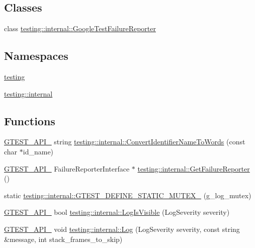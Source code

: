 \subsection*{Classes}
\begin{DoxyCompactItemize}
\item 
class \hyperlink{classtesting_1_1internal_1_1GoogleTestFailureReporter}{testing\+::internal\+::\+Google\+Test\+Failure\+Reporter}
\end{DoxyCompactItemize}
\subsection*{Namespaces}
\begin{DoxyCompactItemize}
\item 
 \hyperlink{namespacetesting}{testing}
\item 
 \hyperlink{namespacetesting_1_1internal}{testing\+::internal}
\end{DoxyCompactItemize}
\subsection*{Functions}
\begin{DoxyCompactItemize}
\item 
\hyperlink{gtest-port_8h_aa73be6f0ba4a7456180a94904ce17790}{G\+T\+E\+S\+T\+\_\+\+A\+P\+I\+\_\+} string \hyperlink{namespacetesting_1_1internal_a571db854f6de337007c53573c9cbf8a3}{testing\+::internal\+::\+Convert\+Identifier\+Name\+To\+Words} (const char $\ast$id\+\_\+name)
\item 
\hyperlink{gtest-port_8h_aa73be6f0ba4a7456180a94904ce17790}{G\+T\+E\+S\+T\+\_\+\+A\+P\+I\+\_\+} Failure\+Reporter\+Interface $\ast$ \hyperlink{namespacetesting_1_1internal_aa261c22df383e9007129c92e36e30e62}{testing\+::internal\+::\+Get\+Failure\+Reporter} ()
\item 
static \hyperlink{namespacetesting_1_1internal_a65647f11a4a74a4282c3cc6d422af0f1}{testing\+::internal\+::\+G\+T\+E\+S\+T\+\_\+\+D\+E\+F\+I\+N\+E\+\_\+\+S\+T\+A\+T\+I\+C\+\_\+\+M\+U\+T\+E\+X\+\_\+} (g\+\_\+log\+\_\+mutex)
\item 
\hyperlink{gtest-port_8h_aa73be6f0ba4a7456180a94904ce17790}{G\+T\+E\+S\+T\+\_\+\+A\+P\+I\+\_\+} bool \hyperlink{namespacetesting_1_1internal_a69ffdba5ee36743e88d8f89b79e566ff}{testing\+::internal\+::\+Log\+Is\+Visible} (Log\+Severity severity)
\item 
\hyperlink{gtest-port_8h_aa73be6f0ba4a7456180a94904ce17790}{G\+T\+E\+S\+T\+\_\+\+A\+P\+I\+\_\+} void \hyperlink{namespacetesting_1_1internal_ac0bc151763a8187d74387c4b2ba685c9}{testing\+::internal\+::\+Log} (Log\+Severity severity, const string \&message, int stack\+\_\+frames\+\_\+to\+\_\+skip)
\end{DoxyCompactItemize}
